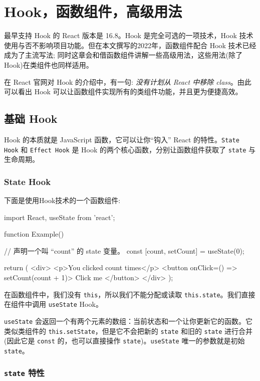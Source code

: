 \section{Hook，函数组件，高级用法}

最早支持 Hook 的 React 版本是 16.8。Hook 是完全可选的一项技术，Hook 技术使用与否不影响项目功能。但在本文撰写的2022年，函数组件配合 Hook 技术已经成为了主流写法; 同时这章会和借函数组件讲解一些高级用法，这些用法(除了 Hook)在类组件也同样适用。

在 React 官网对 Hook 的介绍中，有一句: \textit{没有计划从 React 中移除 class}。由此可以看出 Hook 可以让函数组件实现所有的类组件功能，并且更为便捷高效。

\subsection{基础 Hook}

Hook 的本质就是 JavaScript 函数，它可以让你“钩入” React 的特性。\texttt{State Hook} 和 \texttt{Effect Hook} 是 Hook 的两个核心函数，分别让函数组件获取了 \texttt{state} 与生命周期。

\subsubsection{State Hook}

下面是使用Hook技术的一个函数组件:
\begin{JavaScript}
import React, { useState } from 'react';

function Example() {
  // 声明一个叫 “count” 的 state 变量。
  const [count, setCount] = useState(0);

  return (
    <div>
      <p>You clicked {count} times</p>
      <button onClick={() => setCount(count + 1)}>
        Click me
      </button>
    </div>
  );
}
\end{JavaScript}

在函数组件中，我们没有 \texttt{this}，所以我们不能分配或读取 \texttt{this.state}。我们直接在组件中调用 \texttt{useState} Hook。

\texttt{useState} 会返回一个有两个元素的数组：当前状态和一个让你更新它的函数。它类似类组件的 \texttt{this.setState}，但是它不会把新的 \texttt{state} 和旧的 \texttt{state} 进行合并(因此它是 \texttt{const} 的，也可以直接操作 \texttt{state})。\texttt{useState} 唯一的参数就是初始 \texttt{state}。

\subsubsection*{\texttt{state} 特性}

